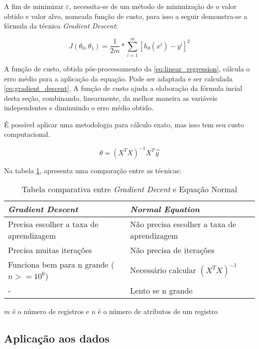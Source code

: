 \documentclass[journal]{IEEEtran}
\begin{document}
A fim de minimizar $\varepsilon$, necessita-se de um método de minimização de o valor obtido e valor alvo, nomeada função de custo, para isso a seguir demonstra-se a fórmula da técnica \textit{Gradient Descent}:

\begin{equation}
J(\theta_0, \theta_1) = \frac{1}{2m} * \sum_{i=1}^{m}[ h_\theta(x^i) - y^i ]^2
\label{eq:gradient_descent}
\end{equation}

A função de custo, obtida pós-processamento da \ref{eq:linear_regression}, cálcula o erro médio para a aplicação da equação. Pode ser adaptada e ser calculada \ref{eq:gradient_descent}. A função de custo ajuda a elaboração da fórmula incial desta seção, combinando, linearmente, da melhor maneira as variáveis independentes e diminuindo o erro médio obtido.

É possível aplicar uma metodologia para cálculo exato, mas isso tem seu custo computacional.

\begin{equation}
\theta = (X^{T}X)^{-1} X^{T} \overrightarrow{y} 
\label{eq:normal_equation}
\end{equation}

Na tabela \ref{tab:adaptation}, apresenta uma comparação entre as técnicas:

\begin{table}[h]
\caption{Tabela comparativa entre \textit{Gradient Decent} e Equação Normal}
\centering
    \begin{tabular}{ | p{4cm} | p{4cm} |}
    \hline
    \textbf{\textit{Gradient Descent}} & \textbf{\textit{Normal Equation}} \\ \hline
    Precisa escolher a taxa de aprendizagem & Não precisa escolher a taxa de aprendizagem \\ \hline
    Precisa muitas iterações & Não precisa de iterações  \\ \hline
   Funciona bem para n grande ($n>=10^6$)  & Necessário calcular $(X^{T}X)^{-1}$  \\ \hline
    - & Lento se  n grande \\ \hline
    \end{tabular}
    \begin{tablenotes}
    \small{$m$ é o número de registros e $n$ é o número de atributos de um registro}
    \end{tablenotes}
\label{tab:adaptation}
\end{table}

\subsection{Aplicação aos dados} %
\label{sub:aplic_metodologia}
\end{document}
